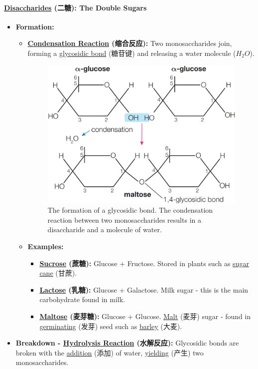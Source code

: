 \paragraph{\underline{Disaccharides} (二糖): The Double Sugars}
\begin{itemize}
    \item \textbf{Formation:}
    \begin{itemize}
        \item \textbf{\underline{Condensation Reaction} (缩合反应):} Two monosaccharides join, forming a \underline{glycosidic
        bond} (糖苷键) and releasing a water molecule ($H_2O$).
        \begin{figure}[H]
            \centering
            \includegraphics[scale=0.18]{Biology/1A/Images/1A-2-4.png}
            \caption{The formation of a glycosidic bond. The condensation reaction between two monosaccharides results in a
            disaccharide and a molecule of water.}
        \end{figure}
        \item \textbf{Examples:}
        \begin{itemize}
            \item \textbf{\underline{Sucrose} (蔗糖):} Glucose + Fructose. Stored in plants such as \underline{sugar cane} (甘蔗).
            \item \textbf{\underline{Lactose} (乳糖):} Glucose + Galactose. Milk sugar - this is the main carbohydrate found in
            milk.
            \item \textbf{\underline{Maltose} (麦芽糖):} Glucose + Glucose. \underline{Malt} (麦芽) sugar - found in
            \underline{germinating} (发芽) seed such as \underline{barley} (大麦).
        \end{itemize}
    \end{itemize}
    \item \textbf{Breakdown - \underline{Hydrolysis Reaction} (水解反应):} Glycosidic bonds are broken with the
    \underline{addition} (添加) of water, \underline{yielding} (产生) two monosaccharides.
\end{itemize}

